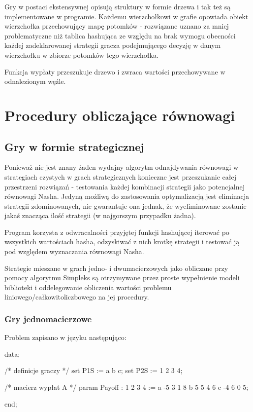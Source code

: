 \documentclass[polish]{standalone}
\begin{document}
Gry w postaci ekstensywnej opisują struktury w formie drzewa i tak też są implementowane w programie. Każdemu 
wierzchołkowi w grafie opowiada obiekt wierzchołka przechowujący mapę potomków - rozwiązane uznano za mniej
problematyczne niż tablica hashująca ze względu na brak wymogu obecności każdej zadeklarowanej strategii gracza
podejmującego decyzję w danym wierzchołku w zbiorze potomków tego wierzchołka.

Funkcja wypłaty przeszukuje drzewo i zwraca wartości przechowywane w odnalezionym węźle.

\section{Procedury obliczające równowagi}

\subsection{Gry w formie strategicznej}

Ponieważ nie jest znany żaden wydajny algorytm odnajdywania równowagi w strategiach czystych w grach strategicznych
konieczne jest przeszukanie całej przestrzeni rozwiązań - testowania każdej kombinacji strategii jako potencjalnej
równowagi Nasha. Jedyną możliwą do zastosowania optymalizacją jest eliminacja strategii zdominowanych, nie gwarantuje
ona jednak, że wyeliminowane zostanie jakaś znacząca ilość strategii (w najgorszym przypadku żadna).

Program korzysta z odwracalności przyjętej funkcji hashującej iterować po wszystkich wartościach hasha, odzyskiwać
z nich krotkę strategii i testować ją pod względem wyznaczania równowagi Nasha.

Strategie mieszane w grach jedno- i dwumacierzowych jako obliczane przy pomocy algorytmu Simpleks są otrzymywane przez
proste wypełnienie modeli biblioteki  i oddelegowanie obliczenia wartości problemu
liniowego/całkowitoliczbowego na jej procedury.

\subsubsection{Gry jednomacierzowe}

Problem zapisano w języku  następująco:

\begin{code}[caption=Przykładowe dane]
data;

/* definicje graczy */
set P1S := a b c;
set P2S := 1 2 3 4;

/* macierz wypłat A */
param Payoff
    :  1  2  3  4 :=
    a  -5 3  1  8
    b  5  5  4  6
    c  -4 6  0  5;
 
end;
\end{code}
\end{document}
